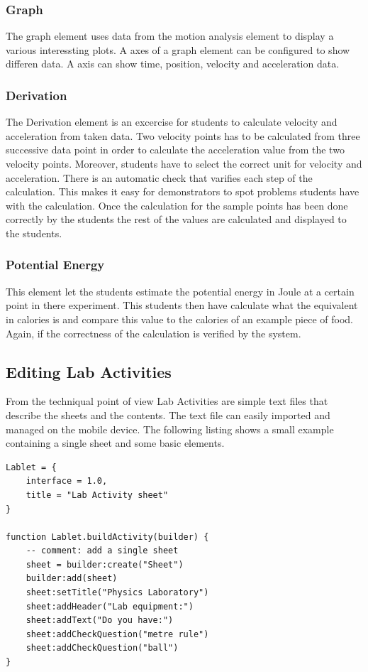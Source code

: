 \documentclass{sigchi}
\begin{document}
\subsubsection*{Graph}
The graph element uses data from the motion analysis element to display a various interessting plots.
A axes of a graph element can be configured to show differen data.
A axis can show time, position, velocity and acceleration data.

\subsubsection*{Derivation}
The Derivation element is an excercise for students to calculate velocity and acceleration from taken data.
Two velocity points has to be calculated from three successive data point in order to calculate the acceleration value from the two velocity points.
Moreover, students have to select the correct unit for velocity and acceleration.
There is an automatic check that varifies each step of the calculation.
This makes it easy for demonstrators to spot problems students have with the calculation.
Once the calculation for the sample points has been done correctly by the students the rest of the values are calculated and displayed to the students.

\subsubsection*{Potential Energy}
This element let the students estimate the potential energy in Joule at a certain point in there experiment.
This students then have calculate what the equivalent in calories is and compare this value to the calories of an example piece of food.
Again, if the correctness of the calculation is verified by the system.

\subsection{Editing Lab Activities}
From the techniqual point of view Lab Activities are simple text files that describe the sheets and the contents.
The text file can easily imported and managed on the mobile device.
The following listing shows a small example containing a single sheet and some basic elements.
\begin{lstlisting}
Lablet = {
    interface = 1.0,
    title = "Lab Activity sheet"
}
 
function Lablet.buildActivity(builder) {
    -- comment: add a single sheet
    sheet = builder:create("Sheet")
    builder:add(sheet)
    sheet:setTitle("Physics Laboratory")
    sheet:addHeader("Lab equipment:")
    sheet:addText("Do you have:")
    sheet:addCheckQuestion("metre rule")
    sheet:addCheckQuestion("ball")
}
\end{lstlisting}
\end{document}

